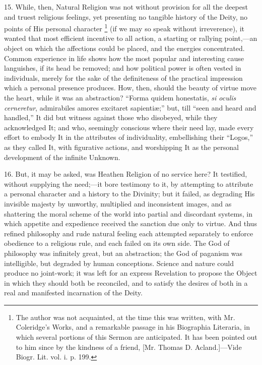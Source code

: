 15. While, then, Natural Religion was not without provision for all
the deepest and truest religious feelings, yet presenting no tangible
history of the Deity, no points of His personal character \footnote{The author was
not acquainted, at the time this was written, with Mr. Coleridge's
Works, and a remarkable passage in his Biographia Literaria, in which
several portions of this Sermon are anticipated. It has been pointed
out to him since by the kindness of a friend, [Mr. Thomas D. Acland.]—Vide
Biogr. Lit. vol. i. p. 199.} (if we may so speak without irreverence), it wanted that most
efficient incentive to all action, a starting or rallying point,—an
object on which the affections could be placed, and the energies
concentrated. Common experience in life shows how the most popular and
interesting cause languishes, if its head be removed; and how
political power is often vested in individuals, merely for the sake of
the definiteness of the practical impression which a personal presence
produces. How, then, should the beauty of virtue move the heart, while
it was an abstraction? ``Forma quidem honestatis, \emph{si oculis
cerneretur}, admirabiles amores excitaret sapientiæ;'' but,
till ``seen and heard and handled,'' It did but witness
against those who disobeyed, while they acknowledged It; and who,
seemingly conscious where their need lay, made every effort to embody
It in the attributes of individuality, embellishing their
``Logos,'' as they called It, with figurative actions, and
worshipping It as the personal development of the infinite Unknown.

16. But, it may be asked, was Heathen Religion of no service here?
It testified, without supplying the need;—it bore testimony to it,
by attempting to attribute a personal character and a history to the
Divinity; but it failed, as degrading His invisible majesty by
unworthy, multiplied and inconsistent images, and as shattering the
moral scheme of the world into partial and discordant systems, in
which appetite and expedience received the sanction due only to
virtue. And thus refined philosophy and rude natural feeling each
attempted separately to enforce obedience to a religious rule, and
each failed on its own side. The God of philosophy was infinitely
great, but an abstraction; the God of paganism was intelligible, but
degraded by human conceptions. Science and nature could produce no
joint-work; it was left for an express Revelation to propose the
Object in which they should both be reconciled, and to satisfy the
desires of both in a real and manifested incarnation of the Deity.


